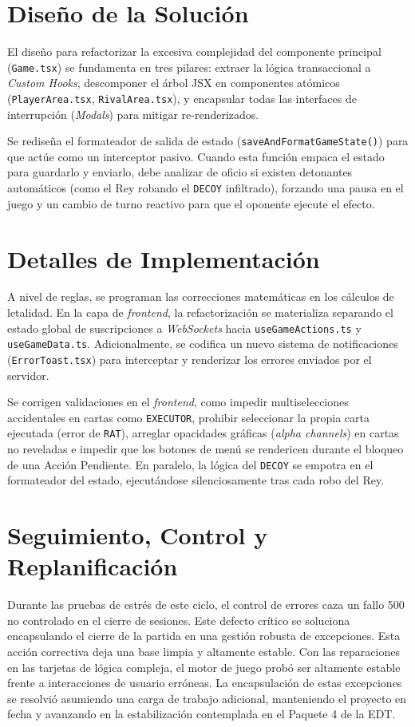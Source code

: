 \section{Diseño de la Solución}
El diseño para refactorizar la excesiva complejidad del componente principal (\texttt{Game.tsx}) se fundamenta en tres pilares: extraer la lógica transaccional a \textit{Custom Hooks}, descomponer el árbol JSX en componentes atómicos (\texttt{PlayerArea.tsx}, \texttt{RivalArea.tsx}), y encapsular todas las interfaces de interrupción (\textit{Modals}) para mitigar re-renderizados.

Se rediseña el formateador de salida de estado (\texttt{saveAndFormatGameState()}) para que actúe como un interceptor pasivo. Cuando esta función empaca el estado para guardarlo y enviarlo, debe analizar de oficio si existen detonantes automáticos (como el Rey robando el \texttt{DECOY} infiltrado), forzando una pausa en el juego y un cambio de turno reactivo para que el oponente ejecute el efecto.

\section{Detalles de Implementación}
A nivel de reglas, se programan las correcciones matemáticas en los cálculos de letalidad. En la capa de \textit{frontend}, la refactorización se materializa separando el estado global de suscripciones a \textit{WebSockets} hacia \texttt{useGameActions.ts} y \texttt{useGameData.ts}. Adicionalmente, se codifica un nuevo sistema de notificaciones (\texttt{ErrorToast.tsx}) para interceptar y renderizar los errores enviados por el servidor.

Se corrigen validaciones en el \textit{frontend}, como impedir multiselecciones accidentales en cartas como \texttt{EXECUTOR}, prohibir seleccionar la propia carta ejecutada (error de \texttt{RAT}), arreglar opacidades gráficas (\textit{alpha channels}) en cartas no reveladas e impedir que los botones de menú se rendericen durante el bloqueo de una Acción Pendiente. En paralelo, la lógica del \texttt{DECOY} se empotra en el formateador del estado, ejecutándose silenciosamente tras cada robo del Rey.

\section{Seguimiento, Control y Replanificación}
Durante las pruebas de estrés de este ciclo, el control de errores caza un fallo 500 no controlado en el cierre de sesiones. Este defecto crítico se soluciona encapsulando el cierre de la partida en una gestión robusta de excepciones. Esta acción correctiva deja una base limpia y altamente estable. Con las reparaciones en las tarjetas de lógica compleja, el motor de juego probó ser altamente estable frente a interacciones de usuario erróneas. La encapsulación de estas excepciones se resolvió asumiendo una carga de trabajo adicional, manteniendo el proyecto en fecha y avanzando en la estabilización contemplada en el Paquete 4 de la EDT.


